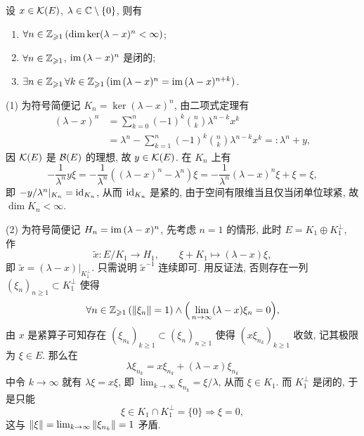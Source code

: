 	\begin{Proposition}\label{prop:lambda-T的性质}
        设 $ x\in\mathcal{K}(E) $, $ \lambda\in\mathbb{C}\setminus\{0\} $, 则有
        \begin{enumerate}[(1)]
            \item $ \forall n\in\mathbb{Z}_{\geqslant 1}\,(\dim\ker(\lambda-x)^n<\infty) $;
            \item $ \forall n\in\mathbb{Z}_{\geqslant 1} $, $ \mathrm{im}\,(\lambda-x)^n $ 是闭的;
            \item $ \exists n\in\mathbb{Z}_{\geqslant 1}\,\forall k\in\mathbb{Z}_{\geqslant 1}\,(\mathrm{im}\,(\lambda-x)^n=\mathrm{im}\,(\lambda-x)^{n+k}) $.
        \end{enumerate}
    \end{Proposition}
    \begin{Proof}
        (1) 为符号简便记 $ K_n=\ker(\lambda-x)^n $, 由二项式定理有
        \[
            \begin{aligned}
                (\lambda-x)^n&=\sum_{k=0}^n(-1)^k\binom{n}{k}\lambda^{n-k}x^k\\
                &=\lambda^n-\sum_{k=1}^n(-1)^k\binom{n}{k}\lambda^{n-k}x^k=:\lambda^n+y,
            \end{aligned}
        \]
        因 $ \mathcal{K}(E) $ 是 $ \mathcal{B}(E) $ 的理想, 故 $ y\in\mathcal{K}(E) $. 在 $ K_n $ 上有
        \[
            -\frac{1}{\lambda^n}y\xi=-\frac{1}{\lambda^n}((\lambda-x)^n-\lambda^n)\xi=-\frac{1}{\lambda^n}(\lambda-x)^n\xi+\xi=\xi,
        \]
        即 $ -y/\lambda^n|_{K_n}=\mathrm{id}_{K_n} $, 从而 $ \mathrm{id}_{K_n} $ 是紧的, 由于空间有限维当且仅当闭单位球紧, 故 $ \dim K_n<\infty $.

        (2) 为符号简便记 $ H_n=\mathrm{im}\,(\lambda-x)^n $, 先考虑 $ n=1 $ 的情形, 此时 $ E=K_1\oplus K_1^\bot $, 作
        \[
            \tilde{x} : E/K_1\to H_1,\qquad \xi+K_1\mapsto(\lambda-x)\xi,
        \]
        即 $ \tilde{x}=(\lambda-x)|_{K_1^\bot} $. 只需说明 $ \tilde{x}^{-1} $ 连续即可. 用反证法, 否则存在一列 $ (\xi_n)_{n\geqslant 1}\subset K_1^\bot $ 使得
        \[
            \forall n\in\mathbb{Z}_{\geqslant 1}\,(\left\| \xi_n \right\|=1)\land\Big(\lim_{n\to\infty}(\lambda-x)\xi_n=0\Big),
        \]
        由 $ x $ 是紧算子可知存在 $ (\xi_{n_k})_{k\geqslant 1}\subset(\xi_n)_{n\geqslant 1} $ 使得 $ (x\xi_{n_k})_{k\geqslant 1} $ 收敛, 记其极限为 $ \xi\in E $. 那么在
        \[
            \lambda\xi_{n_k}=x\xi_{n_k}+(\lambda-x)\xi_{n_k}
        \]
        中令 $ k\to\infty $ 就有 $ \lambda\xi=x\xi $, 即 $ \lim_{k\to\infty}\xi_{n_k}=\xi/\lambda $, 从而 $ \xi\in K_1 $. 而 $ K_1^\bot $ 是闭的, 于是只能
        \[
            \xi\in K_1\cap K_1^\bot=\{0\}\Longrightarrow\xi=0,
        \]
        这与 $ \left\| \xi \right\|=\lim_{k\to\infty}\left\| \xi_{n_k} \right\|=1 $ 矛盾.


\end{Proof}
